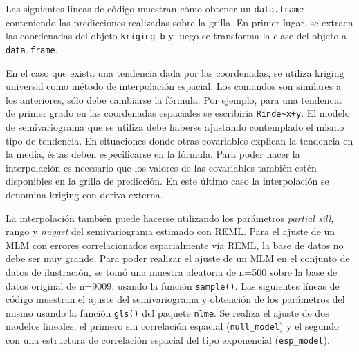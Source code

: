 \documentclass[11pt,b5paper,]{krantz}
\newenvironment{Shaded}{}{}
\newcommand{\DecValTok}[1]{\textcolor[rgb]{0.25,0.63,0.44}{#1}}
\newcommand{\KeywordTok}[1]{\textcolor[rgb]{0.00,0.44,0.13}{\textbf{#1}}}
\newcommand{\NormalTok}[1]{#1}
\newcommand{\OperatorTok}[1]{\textcolor[rgb]{0.40,0.40,0.40}{#1}}
\newcommand{\StringTok}[1]{\textcolor[rgb]{0.25,0.44,0.63}{#1}}
\begin{document}
Las siguientes líneas de código muestran cómo obtener un \texttt{data.frame} conteniendo las predicciones realizadas sobre la grilla. En primer lugar, se extraen las coordenadas del objeto \texttt{kriging\_b} y luego se transforma la clase del objeto a \texttt{data.frame}.

\begin{Shaded}
\end{Shaded}

En el caso que exista una tendencia dada por las coordenadas, se utiliza kriging universal como método de interpolación espacial. Los comandos son similares a los anteriores, sólo debe cambiarse la fórmula. Por ejemplo, para una tendencia de primer grado en las coordenadas espaciales se escribiría \texttt{Rinde\textasciitilde{}x+y}. El modelo de semivariograma que se utiliza debe haberse ajustando contemplado el mismo tipo de tendencia. En situaciones donde otras covariables explican la tendencia en la media, éstas deben especificarse en la fórmula. Para poder hacer la interpolación es necesario que los valores de las covariables también estén disponibles en la grilla de predicción. En este último caso la interpolación se denomina kriging con deriva externa.

La interpolación también puede hacerse utilizando los parámetros \emph{partial sill}, rango y \emph{nugget} del semivariograma estimado con REML. Para el ajuste de un MLM con errores correlacionados espacialmente vía REML, la base de datos no debe ser muy grande. Para poder realizar el ajuste de un MLM en el conjunto de datos de ilustración, se tomó una muestra aleatoria de n=500 sobre la base de datos original de n=9009, usando la función \texttt{sample()}. Las siguientes líneas de código muestran el ajuste del semivariograma y obtención de los parámetros del mismo usando la función \texttt{gls()} del paquete \texttt{nlme}. Se realiza el ajuste de dos modelos lineales, el primero sin correlación espacial (\texttt{null\_model}) y el segundo con una estructura de correlación espacial del tipo exponencial (\texttt{esp\_model}).
\end{document}
